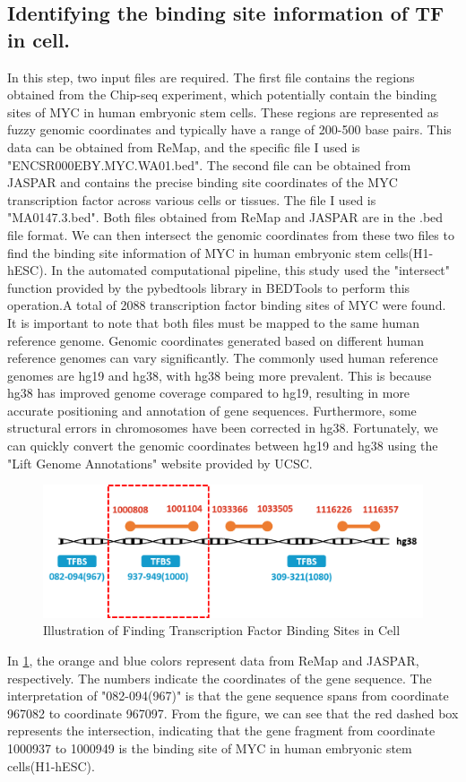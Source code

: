 \documentclass{PHlab-thesis}
\begin{document}
\subsection[Finding TFBSs]{Identifying the binding site information of TF in cell.}
In this step, two input files are required. The first file contains the regions obtained from the Chip-seq experiment, which potentially contain the binding sites of MYC in human embryonic stem cells. These regions are represented as fuzzy genomic coordinates and typically have a range of 200-500 base pairs. This data can be obtained from ReMap, and the specific file I used is "ENCSR000EBY.MYC.WA01.bed". The second file can be obtained from JASPAR and contains the precise binding site coordinates of the MYC transcription factor across various cells or tissues. The file I used is "MA0147.3.bed". Both files obtained from ReMap and JASPAR are in the .bed file format. We can then intersect the genomic coordinates from these two files to find the binding site information of MYC in human embryonic stem cells(H1-hESC). In the automated computational pipeline, this study used the "intersect" function provided by the pybedtools library in BEDTools to perform this operation.A total of 2088 transcription factor binding sites of MYC were found.
It is important to note that both files must be mapped to the same human reference genome. Genomic coordinates generated based on different human reference genomes can vary significantly. The commonly used human reference genomes are hg19 and hg38, with hg38 being more prevalent. This is because hg38 has improved genome coverage compared to hg19, resulting in more accurate positioning and annotation of gene sequences. Furthermore, some structural errors in chromosomes have been corrected in hg38. Fortunately, we can quickly convert the genomic coordinates between hg19 and hg38 using the "Lift Genome Annotations" website provided by UCSC.
\begin{figure}[H]
	\centering
	\includegraphics[scale=0.6]{figures/findTFBSs.png}
	\caption{Illustration of Finding Transcription Factor Binding Sites in Cell }
	\label{fig:findTFBSs} %
\end{figure}
In \ref{fig:findTFBSs}, the orange and blue colors represent data from ReMap and JASPAR, respectively. The numbers indicate the coordinates of the gene sequence. The interpretation of "082-094(967)" is that the gene sequence spans from coordinate 967082 to coordinate 967097. From the figure, we can see that the red dashed box represents the intersection, indicating that the gene fragment from coordinate 1000937 to 1000949 is the binding site of MYC in human embryonic stem cells(H1-hESC).
\end{document}
